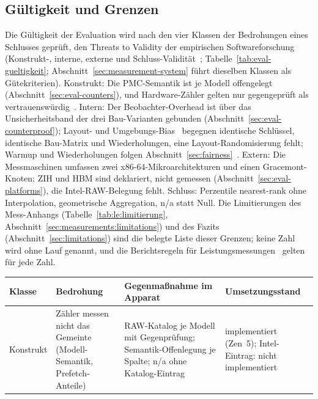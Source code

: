 \begin{nurkurz}
\subsection{Gültigkeit und Grenzen}\label{sec:eval-validity}
Die Gültigkeit der Evaluation wird nach den vier Klassen der Bedrohungen eines Schlusses geprüft, den
Threats to Validity der empirischen Softwareforschung (Konstrukt-, interne, externe und
Schluss-Validität~\cite{wohlin2012experimentation}; Tabelle~\ref{tab:eval-gueltigkeit};
Abschnitt~\ref{sec:measurement-system} führt dieselben Klassen als Gütekriterien). Konstrukt: Die
PMC-Semantik ist je Modell offengelegt (Abschnitt~\ref{sec:eval-counters}), und Hardware-Zähler gelten nur
gegengeprüft als vertrauenswürdig~\cite{weaver2008counters}. Intern: Der Beobachter-Overhead ist über das
Unsicherheitsband der drei Bau-Varianten gebunden (Abschnitt~\ref{sec:eval-counterproof}); Layout- und
Umgebungs-Bias~\cite{mytkowicz2009wrongdata,curtsinger2013stabilizer} begegnen identische Schlüssel,
identische Bau-Matrix und Wiederholungen, eine Layout-Randomisierung fehlt; Warmup und Wiederholungen
folgen Abschnitt~\ref{sec:fairness}~\cite{kalibera2013rigorous}. Extern: Die Messmaschinen umfassen zwei
x86-64-Mikroarchitekturen und einen Gracemont-Knoten; ZIH und HBM sind deklariert, nicht gemessen
(Abschnitt~\ref{sec:eval-platforms}), die Intel-RAW-Belegung fehlt. Schluss: Perzentile nearest-rank ohne
Interpolation, geometrische Aggregation, n/a statt Null. Die Limitierungen des Mess-Anhangs
(Tabelle~\ref{tab:le:limitierung},
Abschnitt~\ref{sec:measurements:limitations}) und des Fazits (Abschnitt~\ref{sec:limitations}) sind die
belegte Liste dieser Grenzen; keine Zahl wird ohne Lauf genannt, und die Berichtsregeln für
Leistungsmessungen~\cite{hoefler2015benchmarking,blackburn2016truth} gelten für jede Zahl.
\begin{table}[htbp]\centering\footnotesize
\begin{tabular}{@{}>{\raggedright\arraybackslash}p{1.6cm}>{\raggedright\arraybackslash}p{4.0cm}>{\raggedright\arraybackslash}p{4.9cm}>{\raggedright\arraybackslash}p{3.7cm}@{}}
\toprule
Klasse & Bedrohung & Gegenmaßnahme im Apparat & Umsetzungsstand \\
\midrule
Konstrukt & Zähler messen nicht das Gemeinte (Modell-Semantik, Prefetch-Anteile) & RAW-Katalog je Modell mit Gegenprüfung; Semantik-Offenlegung je Spalte; n/a ohne Katalog-Eintrag & implementiert (Zen~5); Intel-Eintrag: nicht implementiert \\

\end{tabular}
\end{table}
\end{nurkurz}
